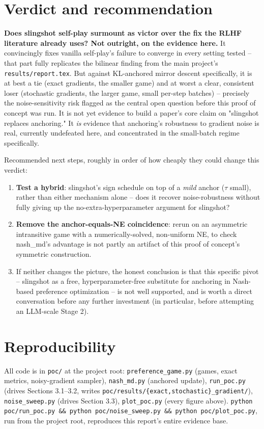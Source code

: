 \documentclass[11pt]{article}
\begin{document}
\section{Verdict and recommendation}
\textbf{Does slingshot self-play surmount as victor over the fix the RLHF
literature already uses? Not outright, on the evidence here.} It
convincingly fixes vanilla self-play's failure to converge in every setting
tested -- that part fully replicates the bilinear finding from the main
project's \texttt{results/report.tex}. But against KL-anchored mirror
descent specifically, it is at best a tie (exact gradients, the smaller
game) and at worst a clear, consistent loser (stochastic gradients, the
larger game, small per-step batches) -- precisely the noise-sensitivity risk
flagged as the central open question before this proof of concept was run.
It is not yet evidence to build a paper's core claim on "slingshot replaces
anchoring." It \emph{is} evidence that anchoring's robustness to gradient
noise is real, currently undefeated here, and concentrated in the
small-batch regime specifically.

Recommended next steps, roughly in order of how cheaply they could change
this verdict:
\begin{enumerate}
  \item \textbf{Test a hybrid}: slingshot's sign schedule on top of a
  \emph{mild} anchor ($\tau$ small), rather than either mechanism alone --
  does it recover noise-robustness without fully giving up the
  no-extra-hyperparameter argument for slingshot?
  \item \textbf{Remove the anchor-equals-NE coincidence}: rerun on an
  asymmetric intransitive game with a numerically-solved, non-uniform NE,
  to check nash\_md's advantage is not partly an artifact of this proof of
  concept's symmetric construction.
  \item If neither changes the picture, the honest conclusion is that this
  specific pivot -- slingshot as a free, hyperparameter-free substitute for
  anchoring in Nash-based preference optimization -- is not well supported,
  and is worth a direct conversation before any further investment (in
  particular, before attempting an LLM-scale Stage 2).
\end{enumerate}

\section{Reproducibility}
All code is in \texttt{poc/} at the project root:
\texttt{preference\_game.py} (games, exact metrics, noisy-gradient sampler),
\texttt{nash\_md.py} (anchored update), \texttt{run\_poc.py} (drives Sections
3.1--3.2, writes \texttt{poc/results/\{exact,stochastic\}\_gradient/}),
\texttt{noise\_sweep.py} (drives Section 3.3), \texttt{plot\_poc.py} (every
figure above). \texttt{python poc/run\_poc.py \&\& python poc/noise\_sweep.py
\&\& python poc/plot\_poc.py}, run from the project root, reproduces this
report's entire evidence base.
\end{document}

